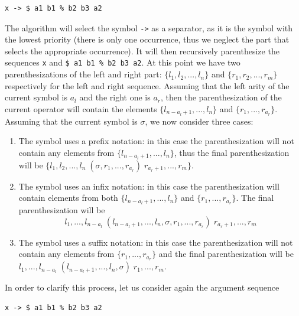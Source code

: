 \begin{lstlisting}
x -> $ a1 b1 % b2 b3 a2
\end{lstlisting}

\noindent
The algorithm will select the symbol \texttt{->} as a separator, as it is the symbol with the lowest priority (there is only one occurrence, thus we neglect the part that selects the appropriate occurrence). It will then recursively parenthesize the sequences \texttt{x} and \texttt{\$ a1 b1 \% b2 b3 a2}. At this point we have two parenthesizations of the left and right part: $\lbrace l_1, l_2, ..., l_n \rbrace$ and $\lbrace r_1, r_2, ..., r_m \rbrace$ respectively for the left and right sequence. Assuming that the left arity of the current symbol is $a_l$ and the right one is $a_r$, then the parenthesization of the current operator will contain the elements $\lbrace l_{n - a_l + 1}, ..., l_{n} \rbrace$ and $\lbrace r_1, ..., r_{a_r} \rbrace$. Assuming that the current symbol is $\sigma$, we now consider three cases:

\begin{enumerate}
	\item The symbol uses a prefix notation: in this case the parenthesization will not contain any elements from $\lbrace l_{n - a_l + 1}, ..., l_{n} \rbrace$, thus the final parenthesization will be $\lbrace l_1, l_2, ..., l_n \; (\sigma, r_1, ..., r_{a_r}) \; r_{a_r + 1}, ..., r_{m} \rbrace$.
	\item The symbol uses an infix notation: in this case the parenthesization will contain elements from both $\lbrace l_{n - a_l + 1}, ..., l_{n} \rbrace$ and $\lbrace r_1, ..., r_{a_r} \rbrace$. The final parenthesization will be $$l_1, ...,l_{n - a_l} \; (l_{n - a_l + 1}, ..., l_{n},\sigma, r_1, ..., r_{a_r}) \; r_{a_r + 1} ,..., r_{m}$$
	\item The symbol uses a suffix notation: in this case the parenthesization will not contain any elements from $\lbrace r_1, ..., r_{a_r} \rbrace$ and the final parenthesization will be $l_1,...,l_{n - a_l} \; (l_{n - a_l + 1}, ..., l_{n},\sigma) \; r_{1},...,r_{m}$.
\end{enumerate}

In order to clarify this process, let us consider again the argument sequence

\begin{lstlisting}
x -> $ a1 b1 % b2 b3 a2
\end{lstlisting}


